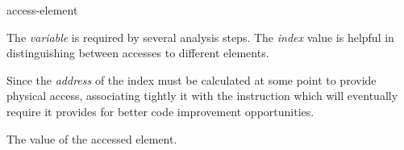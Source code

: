 \begin{instruction}{access-element}\label{memory-access:element}

  \begin{notes}
    The \emph{variable} is required by several analysis steps.  The
    \emph{index} value is helpful in distinguishing between accesses
    to different elements.

    Since the \emph{address} of the index must be calculated at some
    point to provide physical access, associating tightly it with the
    instruction which will eventually require it provides for better
    code improvement opportunities.
  \end{notes}

  \begin{results}
  \item The value of the accessed element.
  \end{results}

  \begin{operands}
  \item {}
  \item {}
  \item {}
  \end{operands}

  \begin{seealso}
  \end{seealso}
\end{instruction}


